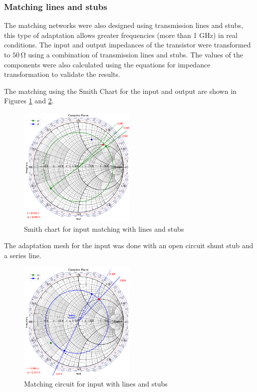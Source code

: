 \subsubsection{Matching lines and stubs}
The matching networks were also designed using transmission lines and stubs, this type of adaptation allows greater frequencies (more than 1 \si{\giga \hertz}) in real conditions. The input and output impedances of the transistor were transformed to $50\,\si{\ohm}$ using a combination of transmission lines and stubs. The values of the components were also calculated using the equations for impedance transformation to validate the results.

The matching using the Smith Chart for the input and output are shown in Figures \ref{fig:zs-line-matching} and \ref{fig:zl-line-matching}.

\begin{figure}[H]
    \centering
    \includegraphics[width=0.5\textwidth]{Images/zs-LS-matching.png}
    \caption{Smith chart for input matching with lines and stubs}
    \label{fig:zs-line-matching}
\end{figure}

The adaptation mesh for the input was done with an open circuit shunt stub and a series line. 

\begin{figure}[H]
    \centering
    \includegraphics[width=0.5\textwidth]{Images/zl-LS-matching.png}
    \caption{Matching circuit for input with lines and stubs}
    \label{fig:zl-line-matching}
\end{figure}

